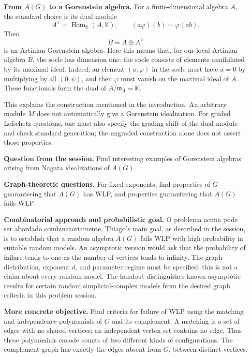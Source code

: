 \medskip\noindent
\textbf{From $A(G)$ to a Gorenstein
algebra.}
For a finite-dimensional algebra $A$, the
standard choice is its dual module
$$
A^\vee=\operatorname{Hom}_{\mathbb{K}}
(A,\mathbb{K}),
\qquad (a\varphi)(b)=\varphi(ab).
$$
Then
$$
B=A\oplus A^\vee
$$
is an Artinian Gorenstein algebra.
Here this means that, for our local
Artinian algebra $B$, the socle has
dimension one; the socle consists of
elements annihilated by its maximal ideal.
Indeed, an element $(a,\varphi)$ in the
socle must have $a=0$ by multiplying by
all $(0,\psi)$, and then $\varphi$ must
vanish on the maximal ideal of $A$.
These functionals form the dual of
$A/\mathfrak{m}_A=\mathbb{K}$.

This explains the construction mentioned
in the introduction. An arbitrary module
$M$ does not automatically give a
Gorenstein idealization.
For graded Lefschetz questions, one must
also specify the grading shift of the
dual module and check standard generation;
the ungraded construction alone does not
assert those properties.

\medskip\noindent
\textbf{Question from the session.}
Find interesting examples of Gorenstein
algebras arising from Nagata idealizations
of $A(G)$.

\medskip\noindent
\textbf{Graph-theoretic questions.}
For fixed exponents, find properties of
$G$ guaranteeing that $A(G)$ has WLP,
and properties guaranteeing that $A(G)$
fails WLP.

\medskip\noindent
\textbf{Combinatorial approach and
probabilistic goal.}
O problema acima pode ser abordado
combinatoriamente.
Thiago's main goal, as described in the
session, is to establish that a random
algebra $A(G)$ fails WLP with high
probability in suitable random models.
An asymptotic version would ask that the
probability of failure tends to one as
the number of vertices tends to infinity.
The graph distribution, exponent $d$,
and parameter regime must be specified;
this is not a claim about every random
model. The handout distinguishes known
asymptotic results for certain random
simplicial-complex models from the desired
graph criteria in this problem session.

\medskip\noindent
\textbf{More concrete objective.}
Find criteria for failure of WLP using
the matching and independence polynomials
of $G$ and its complement.
A matching is a set of edges with no
shared vertices; an independent vertex
set contains no edge.
Thus these polynomials encode counts of
two different kinds of configurations.
The complement graph has exactly the
edges absent from $G$, between distinct
vertices.

